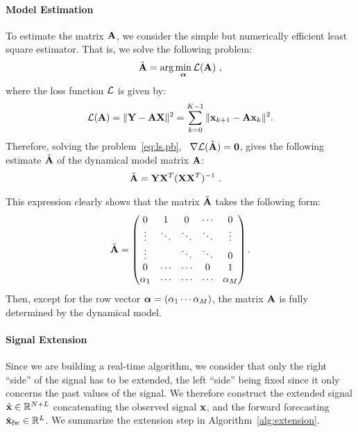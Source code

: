 \paragraph{Model Estimation} To estimate the matrix ${\mathbf A}$, we consider the simple but numerically efficient least square estimator. That is, we solve the following problem:
\begin{equation}
\label{eq:ls.pb}
\tilde\bA = \arg\min_{\balpha} \cL(\bA)\ ,
\end{equation}
where the loss function ${\mathcal L}$ is given by:
\[
{\mathcal L}({\mathbf A}) = \|{\mathbf Y}-{\mathbf A}{\mathbf X}\|^2 = \sum_{k=0}^{K-1} \|{\mathbf x}_{k+1}-{\mathbf A}{\mathbf x}_k\|^2.
\]
Therefore, solving the problem~\eqref{eq:ls.pb}, \ie~$\nabla {\mathcal L}(\tilde{{\mathbf A}})=\boldsymbol{0}$, gives the following estimate $\tilde{{\mathbf A}}$ of the dynamical model matrix ${\mathbf A}$:
\begin{align}
\tilde\bA &= \bY\bX^T(\bX\bX^T)^{-1}\ .
\label{eq:lse}
\end{align}

\begin{remark}
This expression clearly shows that the matrix $\tilde{{\mathbf A}}$ takes the following form:
\[
\tilde{{\mathbf A}} =
\begin{pmatrix}
0       & 1       & 0      & \cdots & 0      \\
\vdots  & \ddots  & \ddots & \ddots & \vdots  \\
\vdots  &         & \ddots & \ddots & 0  \\
0       & \cdots  & \cdots & 0      & 1  \\
\alpha_1& \cdots  & \cdots & \cdots & \alpha_M  \\
\end{pmatrix}.
\]
Then, except for the row vector $\boldsymbol{\alpha} = \left(\alpha_1 \cdots\alpha_M\right)$, the matrix ${\mathbf A}$ is fully determined by the dynamical model.
\end{remark}

\paragraph{Signal Extension} Since we are building a real-time algorithm, we consider that only the right ``side'' of the signal has to be extended, the left ``side'' being fixed since it only concerns the past values of the signal. We therefore construct the extended signal $\tilde{{\mathbf x}}\in{\mathbb R}^{N+L}$ concatenating the observed signal ${\mathbf x}$, and the forward forecasting $\tilde{{\mathbf x}}_{\mathrm{fw}}\in{\mathbb R}^L$. We summarize the extension step in Algorithm~\ref{alg:extension}. %

